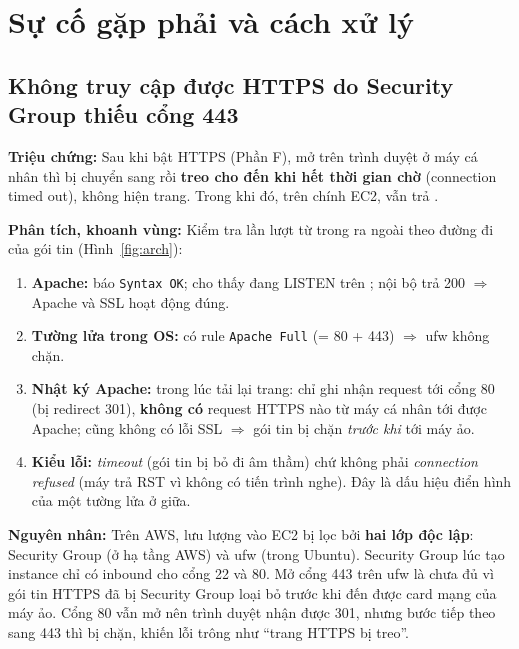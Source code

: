 \section{Sự cố gặp phải và cách xử lý}
\label{sec:loi}

\subsection{Không truy cập được HTTPS do Security Group thiếu cổng 443}

\textbf{\large Triệu chứng:} Sau khi bật HTTPS (Phần F), mở
 trên trình duyệt ở máy cá nhân thì bị chuyển
sang  rồi \textbf{treo cho đến khi hết thời gian chờ} (connection
timed out), không hiện trang. Trong khi đó, trên chính EC2,
 vẫn trả .

\textbf{\large Phân tích, khoanh vùng:} Kiểm tra lần lượt từ trong ra ngoài theo
đường đi của gói tin (Hình~\ref{fig:arch}):
\begin{enumerate}
  \item \textbf{Apache:}  báo \texttt{Syntax OK};
         cho thấy  đang LISTEN trên
        ;  nội bộ trả 200 $\Rightarrow$ Apache và SSL hoạt động đúng.
  \item \textbf{Tường lửa trong OS:}  có rule
        \texttt{Apache Full} (= 80 + 443) $\Rightarrow$ ufw không chặn.
  \item \textbf{Nhật ký Apache:} 
        trong lúc tải lại trang: chỉ ghi nhận request tới cổng 80 (bị
        redirect 301), \textbf{không có} request HTTPS nào từ máy cá nhân tới
        được Apache;  cũng không có lỗi SSL
        $\Rightarrow$ gói tin bị chặn \emph{trước khi} tới máy ảo.
  \item \textbf{Kiểu lỗi:} \emph{timeout} (gói tin bị bỏ đi âm thầm) chứ không
        phải \emph{connection refused} (máy trả RST vì không có tiến trình
        nghe). Đây là dấu hiệu điển hình của một tường lửa ở giữa.
\end{enumerate}

\textbf{\large Nguyên nhân:} Trên AWS, lưu lượng vào EC2 bị lọc bởi \textbf{hai
lớp độc lập}: Security Group (ở hạ tầng AWS) và ufw (trong Ubuntu). Security
Group lúc tạo instance chỉ có inbound cho cổng 22 và 80. Mở cổng 443 trên ufw
là chưa đủ vì gói tin HTTPS đã bị Security Group loại bỏ trước khi đến được
card mạng của máy ảo. Cổng 80 vẫn mở nên trình duyệt nhận được 301, nhưng bước
tiếp theo sang 443 thì bị chặn, khiến lỗi trông như ``trang HTTPS bị treo''.

